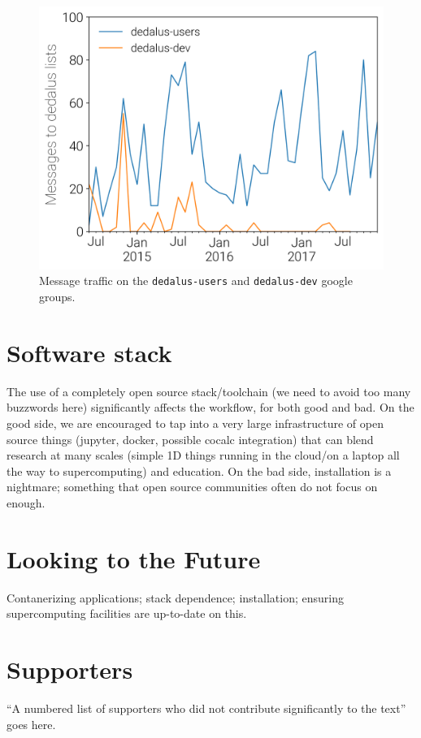 \documentclass[12pt, preprint]{aastex}
\begin{document}
\begin{figure}
  \centering
  \includegraphics{../figs/message_counts.png}
  \caption{Message traffic on the \texttt{dedalus-users} and \texttt{dedalus-dev} google groups.}
  \label{fig:messages}
\end{figure}

\section{Software stack}
\label{sec:stack}

The use of a completely open source stack/toolchain (we need to avoid too many buzzwords here) significantly affects the workflow, for both good and bad. On the good side, we are encouraged to tap into a very large infrastructure of open source things (jupyter, docker, possible cocalc integration) that can blend research at many scales (simple 1D things running in the cloud/on a laptop all the way to supercomputing) and education. On the bad side, installation is a nightmare; something that open source communities often do not focus on enough.

\section{Looking to the Future}
\label{sec:future}

Contanerizing applications; stack dependence; installation; ensuring supercomputing facilities are up-to-date on this.
\appendix

\section{Supporters}
\label{sec:supporters}

``A numbered list of supporters who did not contribute significantly to the text'' goes here.



\end{document}
